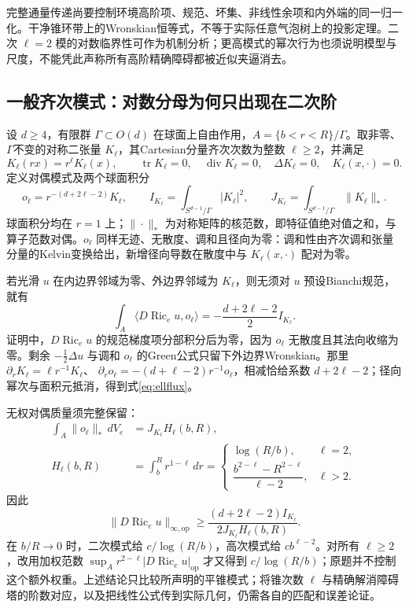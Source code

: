 \documentclass[UTF8,a4paper,11pt,fontset=fandol]{ctexart}
\numberwithin{equation}{section}
\theoremstyle{definition}
\newcommand{\Ric}{\operatorname{Ric}}
\newcommand{\tr}{\operatorname{tr}}
\newcommand{\op}{\mathrm{op}}
\begin{document}
完整通量传递尚要控制环境高阶项、规范、坏集、非线性余项和内外端的同一归一化。干净锥环带上的Wronskian恒等式，不等于实际任意气泡树上的投影定理。二次 $\ell=2$ 模的对数临界性可作为机制分析；更高模式的幂次行为也须说明模型与尺度，不能凭此声称所有高阶精确障碍都被近似夹逼消去。

\subsection{一般齐次模式：对数分母为何只出现在二次阶}\label{sec:ellflux}
设 $d\ge4$，有限群 $\Gamma\subset O(d)$ 在球面上自由作用，$A=\{b<r<R\}/\Gamma$。取非零、$\Gamma$不变的对称二张量 $K_\ell$，其Cartesian分量齐次次数为整数 $\ell\ge2$，并满足
\[
K_\ell(rx)=r^\ell K_\ell(x),\qquad
\tr K_\ell=0,\quad\operatorname{div}K_\ell=0,\quad
\Delta K_\ell=0,\quad K_\ell(x,\cdot)=0.
\]
定义对偶模式及两个球面积分
\[
o_\ell=r^{-(d+2\ell-2)}K_\ell,\qquad
I_{K_\ell}=\int_{S^{d-1}/\Gamma}|K_\ell|^2,\qquad
J_{K_\ell}=\int_{S^{d-1}/\Gamma}\|K_\ell\|_*.
\]
球面积分均在 $r=1$ 上；$\|\cdot\|_*$ 为对称矩阵的核范数，即特征值绝对值之和，与算子范数对偶。$o_\ell$ 同样无迹、无散度、调和且径向为零：调和性由齐次调和张量分量的Kelvin变换给出，新增径向导数在散度中与 $K_\ell(x,\cdot)$ 配对为零。

若光滑 $u$ 在内边界邻域为零、外边界邻域为 $K_\ell$，则无须对 $u$ 预设Bianchi规范，就有
\begin{equation}\label{eq:ellflux}
\int_A\langle D\Ric_e u,o_\ell\rangle
=-\frac{d+2\ell-2}{2}I_{K_\ell}.
\end{equation}
证明中，$D\Ric_eu$ 的规范梯度项分部积分后为零，因为 $o_\ell$ 无散度且其法向收缩为零。剩余 $-\frac12\Delta u$ 与调和 $o_\ell$ 的Green公式只留下外边界Wronskian。那里
$\partial_rK_\ell=\ell r^{-1}K_\ell$、
$\partial_ro_\ell=-(d+\ell-2)r^{-1}o_\ell$，相减恰给系数 $d+2\ell-2$；径向幂次与面积元抵消，得到式\eqref{eq:ellflux}。

无权对偶质量须完整保留：
\begin{align}
\int_A\|o_\ell\|_*\,dV_e
&=J_{K_\ell}H_\ell(b,R),\\
H_\ell(b,R)&=\int_b^Rr^{1-\ell}\,dr
=\begin{cases}
\log(R/b),&\ell=2,\\[1mm]
\dfrac{b^{2-\ell}-R^{2-\ell}}{\ell-2},&\ell>2.
\end{cases}
\end{align}
因此
\begin{equation}\label{eq:ellfluxbound}
\|D\Ric_eu\|_{\infty,\op}
\ge\frac{(d+2\ell-2)I_{K_\ell}}{2J_{K_\ell}H_\ell(b,R)}.
\end{equation}
在 $b/R\to0$ 时，二次模式给 $c/\log(R/b)$，高次模式给 $cb^{\ell-2}$。对所有 $\ell\ge2$，改用加权范数 $\sup_A r^{2-\ell}|D\Ric_eu|_{\op}$ 才又得到 $c/\log(R/b)$；原题并不控制这个额外权重。上述结论只比较所声明的平锥模式；将锥次数 $\ell$ 与精确解消障碍塔的阶数对应，以及把线性公式传到实际几何，仍需各自的匹配和误差论证。
\end{document}
